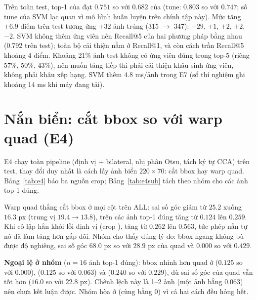 Trên toàn test, top-1 của  đạt $0.751$ so với $0.682$ của  (tune: $0.803$ so với $0.747$; số tune của SVM lạc quan vì mô hình huấn luyện trên chính tập này). Mức tăng $+6.9$ điểm trên test tương ứng $+32$ ảnh trúng (315 $\to$ 347):  $+29$,  $+1$,  $+2$,  $+2$,  $-2$. SVM không thêm ứng viên nên Recall@5 của hai phương pháp bằng nhau (0.792 trên test); toàn bộ cải thiện nằm ở Recall@1, và  còn cách trần Recall@5 khoảng 4 điểm. Khoảng 21\% ảnh test không có ứng viên đúng trong top-5 (riêng  57\%,  50\%,  43\%), nên muốn tăng tiếp thì phải cải thiện khâu sinh ứng viên, không phải khâu xếp hạng. SVM thêm 4.8 ms/ảnh trong E7 (sổ thí nghiệm ghi khoảng 14 ms khi máy đang tải).

\section{Nắn biển: cắt bbox so với warp quad (E4)}
\label{sec:e4}

E4 chạy toàn pipeline (định vị  + bilateral, nhị phân Otsu, tách ký tự CCA) trên test, thay đổi duy nhất là cách lấy ảnh biển $220\times 70$: cắt bbox hay warp quad. Bảng~\ref{tab:e4} báo ba nguồn crop; Bảng~\ref{tab:e4sub} tách theo nhóm cho các ảnh top-1 đúng.





Warp quad thắng cắt bbox ở mọi cột trên ALL: sai số góc giảm từ $25.2$ xuống $16.3$ px (trung vị $19.4\to 13.8$),  trên các ảnh top-1 đúng tăng từ $0.124$ lên $0.259$. Khi cô lập hẳn khỏi lỗi định vị (crop ),  tăng từ $0.262$ lên $0.563$, tức phép nắn tự nó đã làm  tăng hơn gấp đôi. Nhóm  cho thấy đúng lý do: bbox ngang không bù được độ nghiêng, sai số góc $68.0$ px so với $28.9$ px của quad và  $0.000$ so với $0.429$.

\textbf{Ngoại lệ ở nhóm } ($n=16$ ảnh top-1 đúng): bbox nhỉnh hơn quad ở  ($0.125$ so với $0.000$),  ($0.125$ so với $0.063$) và  ($0.240$ so với $0.229$), dù sai số góc của quad vẫn tốt hơn ($16.0$ so với $22.8$ px). Chênh lệch này là 1--2 ảnh (một ảnh bằng $0.063$) nên chưa kết luận được. Nhóm  hòa ở  (cùng bằng 0) vì cả hai cách đều hỏng hết.

